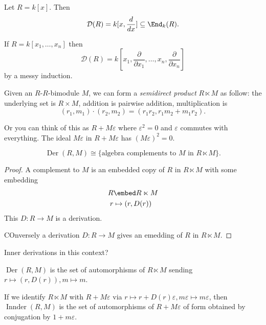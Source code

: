 \documentclass[a4paper]{article}
\DeclareMathOperator{\Der}{Der}
\DeclareMathOperator{\Innder}{Innder}
\begin{document}
\begin{eg}
  Let \(R = k[x]\). Then
  \[
    \mathcal D(R) = k[x, \frac{d}{dx}] \subseteq \End_k(R).
  \]

  If \(R = k[x_1, \dots, x_n]\) then
  \[
    \mathcal D(R) = k[x_1, \frac{\partial  }{\partial x_1}, \dots, x_n, \frac{\partial  }{\partial x_n}]
  \]
  by a messy induction.
\end{eg}

\begin{definition}
  Given an \(R\)-\(R\)-bimodule \(M\), we can form a \emph{semidirect product} \(R \ltimes M\) as follow: the underlying set is \(R \times M\), addition is pairwise addition, multiplication is
  \[
    (r_1, m_1) \cdot (r_2, m_2) = (r_1r_2, r_1m_2 + m_1r_2).
  \]
\end{definition}

Or you can think of this as \(R + M\varepsilon\) where \(\varepsilon^2 = 0\) and \(\varepsilon\) commutes with everything. The ideal \(M\varepsilon\) in \(R + M\varepsilon\) has \((M\varepsilon)^2 = 0\).

\begin{lemma}
  \[
    \Der(R, M) \cong \{\text{algebra complements to \(M\) in } R \ltimes M\}.
  \]
\end{lemma}

\begin{proof}
  A complement to \(M\) is an embedded copy of \(R\) in \(R \ltimes M\) with some embedding
  \begin{align*}
    R &\embed R \ltimes M \\
    r &\mapsto (r, D(r))
  \end{align*}
  This \(D: R \to M\) is a derivation.

  COnversely a derivation \(D: R \to M\) gives an emedding of \(R\) in \(R \ltimes M\).
\end{proof}

Inner derivations in this context?

\begin{corollary}
  \(\Der(R, M)\) is the set of automorphisms of \(R \ltimes M\) sending \(r \mapsto (r, D(r)), m \mapsto m\).

  If we identify \(R \ltimes M\) with \(R + M\varepsilon\) via \(r \mapsto r + D(r)\varepsilon, m\varepsilon \mapsto m\varepsilon\), then \(\Innder(R, M)\) is the set of automorphisms of \(R + M\varepsilon\) of form obtained by conjugation by \(1 + m\varepsilon\).
\end{corollary}
\end{document}
